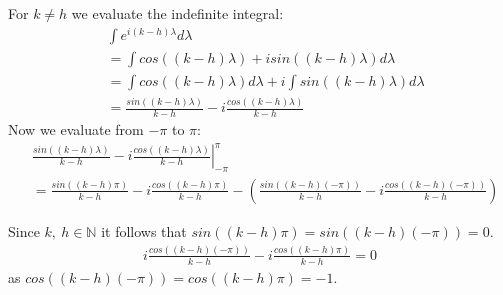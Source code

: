 \documentclass[11pt]{article}
\begin{document}
For $k \neq h$ we evaluate the indefinite integral:
\begin{equation}
  \label{eq:21}
  \begin{split}
    &\int  e^{i(k-h)\lambda} d \lambda\\
    &= \int cos((k-h) \lambda) + i sin((k-h) \lambda) d \lambda\\
    &= \int cos((k-h) \lambda) d \lambda + i \int sin((k-h)\lambda) d \lambda\\
    &= \frac{sin((k-h) \lambda)}{k-h} - i \frac{cos((k-h) \lambda)}{k-h}
  \end{split}
\end{equation}
Now we evaluate from $-\pi$ to $\pi$:
\begin{equation}
  \label{eq:23}
  \begin{split}
    &\left.  \frac{sin((k-h) \lambda)}{k-h} - i \frac{cos((k-h) \lambda)}{k-h} \right\vert_{-\pi}^\pi\\
    &=  \frac{sin((k-h) \pi)}{k-h} - i \frac{cos((k-h) \pi)}{k-h} - \left( \frac{sin((k-h) (-\pi))}{k-h} - i \frac{cos((k-h) (-\pi))}{k-h}\right)
  \end{split}
\end{equation}

Since $k,\ h \in \mathbb{N}$ it follows that $sin((k-h) \pi) = sin((k-h) (-\pi)) = 0$.
\begin{equation}
  \label{eq:24}
  \begin{split}
     i \frac{cos((k-h) (-\pi))}{k-h} -i \frac{cos((k-h) \pi)}{k-h} = 0
  \end{split}
\end{equation}
as $cos((k-h) (-\pi)) = cos((k-h)\pi) = -1$.  


\printbibliography
\end{document}
